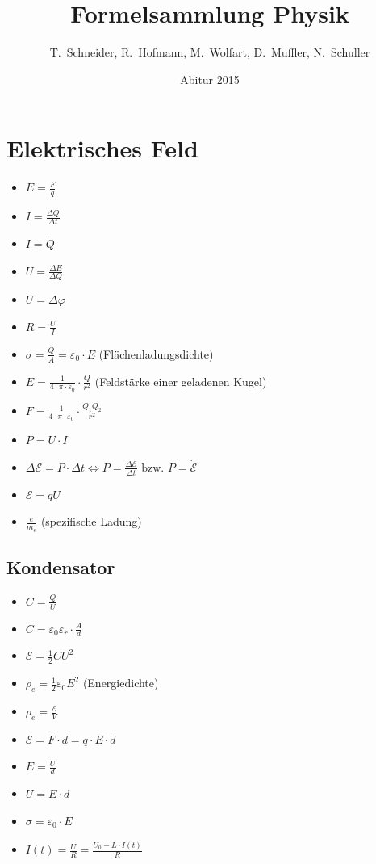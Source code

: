 \documentclass[paper = a4, twocolumn]{scrartcl}
\title{Formelsammlung Physik}
\author{T.~Schneider, R.~Hofmann, M.~Wolfart, D.~Muffler, N.~Schuller}
\date{Abitur 2015}
\DeclareRobustCommand{\E}{\mathcal{E}}
\begin{document}
\maketitle
\tableofcontents

\section{Elektrisches Feld}
\begin{itemize}
\item
	\( E = \frac{F}{q} \)
\item
	\( I = \frac{\Delta Q}{\Delta t} \)
\item
	\( I = \dot{Q} \)
\item
	\( U = \frac{\Delta E}{\Delta Q} \)
\item
	\( U = \Delta \varphi \)
\item
	\( R = \frac{U}{I} \)
\item
	\( \sigma = \frac{Q}{A} = \varepsilon_0 \cdot E \)
	(Flächenladungsdichte)
\item
	\( E = \frac{1}{4 \cdot \pi \cdot \varepsilon_0} \cdot \frac{Q}{r^2} \)
	(Feldstärke einer geladenen Kugel)
\item
	\( F = \frac{1}{4 \cdot \pi \cdot \varepsilon_0} \cdot \frac{Q_1 Q_2}{r^2} \)
\item
	\( P = U \cdot I \)
\item
	\( \Delta \E = P \cdot \Delta t \Leftrightarrow P = \frac{\Delta
	\E}{\Delta t} \mbox{ bzw. } P=\dot{\E} \)
\item
	\( \E = qU \)
\item
	\( \frac{e}{m_e} \) (spezifische Ladung)
\end{itemize}

\subsection{Kondensator}
\begin{itemize}
\item
	\( C = \frac{Q}{U} \)
\item
	\( C = \varepsilon_0 \varepsilon_r \cdot \frac{A}{d} \)
\item
	\( \E = \frac{1}{2} C U^2 \)
\item
	\( \rho_e = \frac{1}{2} \varepsilon_0 E^2 \) (Energiedichte)
\item
	\( \rho_e = \frac{\E}{V} \)
\item
	\( \E = F \cdot d = q \cdot E \cdot d \)
\item
	\( E = \frac{U}{d} \)
\item
	\( U = E \cdot d \)
\item
	\( \sigma = \varepsilon_0 \cdot E \)
\item
	\( I(t) = \frac{U}{R} = \frac{U_0 - L \cdot \dot{I}(t)}{R} \)
\end{itemize}
\end{document}
